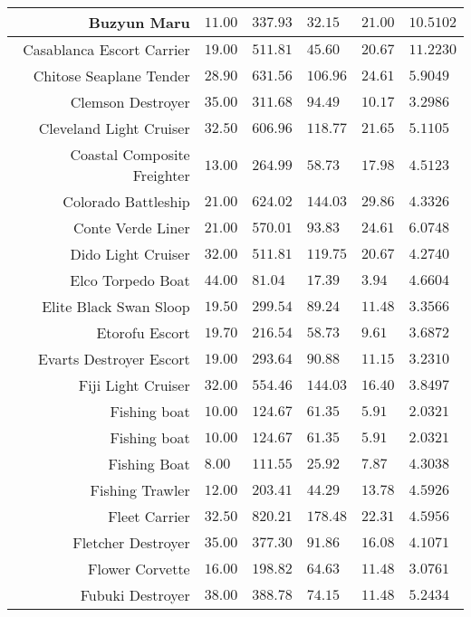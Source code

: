\documentclass{article}
\begin{document}
\begin{tabularx}{\textwidth}{|r|l|l|l|l|X|}
\hline
Buzyun Maru & $11.00$ & $337.93$ & $32.15$ & $21.00$ & $10.5102$ \\
\hline
Casablanca Escort Carrier & $19.00$ & $511.81$ & $45.60$ & $20.67$ & $11.2230$ \\
\hline
Chitose Seaplane Tender & $28.90$ & $631.56$ & $106.96$ & $24.61$ & $5.9049$ \\
\hline
Clemson Destroyer & $35.00$ & $311.68$ & $94.49$ & $10.17$ & $3.2986$ \\
\hline
Cleveland Light Cruiser & $32.50$ & $606.96$ & $118.77$ & $21.65$ & $5.1105$ \\
\hline
Coastal Composite Freighter & $13.00$ & $264.99$ & $58.73$ & $17.98$ & $4.5123$ \\
\hline
Colorado Battleship & $21.00$ & $624.02$ & $144.03$ & $29.86$ & $4.3326$ \\
\hline
Conte Verde Liner & $21.00$ & $570.01$ & $93.83$ & $24.61$ & $6.0748$ \\
\hline
Dido Light Cruiser & $32.00$ & $511.81$ & $119.75$ & $20.67$ & $4.2740$ \\
\hline
Elco Torpedo Boat & $44.00$ & $81.04$ & $17.39$ & $3.94$ & $4.6604$ \\
\hline
Elite Black Swan Sloop & $19.50$ & $299.54$ & $89.24$ & $11.48$ & $3.3566$ \\
\hline
Etorofu Escort & $19.70$ & $216.54$ & $58.73$ & $9.61$ & $3.6872$ \\
\hline
Evarts Destroyer Escort & $19.00$ & $293.64$ & $90.88$ & $11.15$ & $3.2310$ \\
\hline
Fiji Light Cruiser & $32.00$ & $554.46$ & $144.03$ & $16.40$ & $3.8497$ \\
\hline
Fishing boat & $10.00$ & $124.67$ & $61.35$ & $5.91$ & $2.0321$ \\
\hline
Fishing boat & $10.00$ & $124.67$ & $61.35$ & $5.91$ & $2.0321$ \\
\hline
Fishing Boat & $8.00$ & $111.55$ & $25.92$ & $7.87$ & $4.3038$ \\
\hline
Fishing Trawler & $12.00$ & $203.41$ & $44.29$ & $13.78$ & $4.5926$ \\
\hline
Fleet Carrier & $32.50$ & $820.21$ & $178.48$ & $22.31$ & $4.5956$ \\
\hline
Fletcher Destroyer & $35.00$ & $377.30$ & $91.86$ & $16.08$ & $4.1071$ \\
\hline
Flower Corvette & $16.00$ & $198.82$ & $64.63$ & $11.48$ & $3.0761$ \\
\hline
Fubuki Destroyer & $38.00$ & $388.78$ & $74.15$ & $11.48$ & $5.2434$ \\

\end{tabularx}
\end{document}

